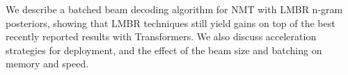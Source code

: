 We describe a batched beam decoding algorithm for NMT with LMBR n-gram posteriors, showing that LMBR techniques still yield gains on top of the best recently reported results with Transformers. We also discuss acceleration strategies for deployment, and the effect of the beam size and batching on memory and speed.
